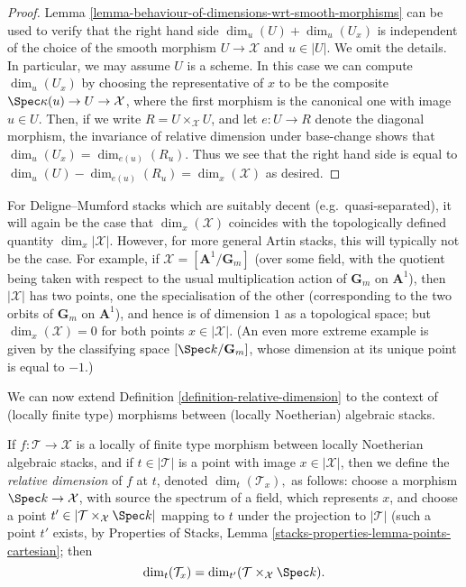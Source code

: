 \begin{proof}
Lemma \ref{lemma-behaviour-of-dimensions-wrt-smooth-morphisms}
can be used to verify that the right hand side
$\dim_u(U) + \dim_u(U_x)$ is independent of the choice
of the smooth morphism $U \to \mathcal{X}$ and $u \in |U|$.
We omit the details. In particular, we may assume $U$ is a scheme.
In this case we can compute $\dim_u(U_x)$
by choosing the representative of $x$
to be the composite $\Spec \kappa(u) \to U \to \mathcal{X}$, where
the first morphism is the canonical one with image $u \in U$.
Then, if we write $R = U \times_{\mathcal{X}} U$, and let
$e : U \to R$ denote the diagonal morphism, the invariance of
relative dimension under base-change shows that
$\dim_u(U_x) = \dim_{e(u)}(R_u)$. Thus we see that
the right hand side is equal to
$\dim_u (U) - \dim_{e(u)}(R_u) = \dim_x(\mathcal{X})$ as desired.
\end{proof}

\begin{remark}
\label{remark-dimension-DM}
For Deligne--Mumford stacks which are suitably decent
(e.g.\ quasi-separated),
it will again be the case that $\dim_x(\mathcal{X})$ coincides with the
topologically
defined quantity $\dim_x |\mathcal{X}|$.  However, for more general Artin
stacks,
this will typically not be the case.  For example, if
$\mathcal{X} = [\mathbf{A}^1/\mathbf{G}_m]$
(over some field, with the quotient being taken with
respect to the usual multiplication action of $\mathbf{G}_m$ on $\mathbf{A}^1$),
then  $|\mathcal{X}|$ has two points, one the specialisation of the other
(corresponding
to the two orbits of $\mathbf{G}_m$ on $\mathbf{A}^1$), and hence is of
dimension $1$ as
a topological space; but $\dim_x (\mathcal{X}) = 0$ for both points
$x \in |\mathcal{X}|$.
(An even more extreme example is given by the classifying space
$[\Spec k/\mathbf{G}_m]$, whose dimension at its unique point
is equal to $-1$.)
\end{remark}

\noindent
We can now extend Definition \ref{definition-relative-dimension}
to the context of (locally finite type)
morphisms between (locally Noetherian) algebraic stacks.

\begin{definition}
\label{definition-relative-dimension-for-stacks}
If $f : \mathcal{T} \to \mathcal{X}$
is a locally of finite type morphism between
locally Noetherian algebraic stacks, and if
$t \in |\mathcal{T}|$ is a point with image $x \in |\mathcal{X}|$, then
we define the {\it relative dimension} of $f$ at $t$, denoted
$\dim_t(\mathcal{T}_x),$ as follows:
choose a morphism $\Spec k \to \mathcal{X}$, with source the spectrum of
a field, which represents $x$, and choose a point
$t' \in |\mathcal{T} \times_{\mathcal{X}} \Spec k|$
mapping to $t$ under the projection to $|\mathcal{T}|$
(such a point $t'$ exists, by
Properties of Stacks, Lemma
\ref{stacks-properties-lemma-points-cartesian}; then
$$
\dim_t(\mathcal{T}_x) = \dim_{t'}(\mathcal{T} \times_{\mathcal{X}} \Spec k ).
$$
\end{definition}


